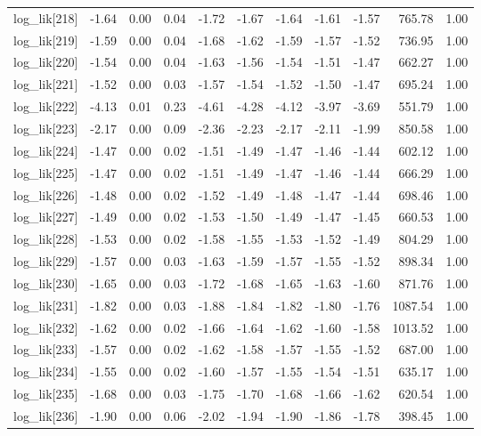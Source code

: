\begin{table}[ht]
\begin{tabular}{rrrrrrrrrrr}
  log\_lik[218] & -1.64 & 0.00 & 0.04 & -1.72 & -1.67 & -1.64 & -1.61 & -1.57 & 765.78 & 1.00 \\ 
  log\_lik[219] & -1.59 & 0.00 & 0.04 & -1.68 & -1.62 & -1.59 & -1.57 & -1.52 & 736.95 & 1.00 \\ 
  log\_lik[220] & -1.54 & 0.00 & 0.04 & -1.63 & -1.56 & -1.54 & -1.51 & -1.47 & 662.27 & 1.00 \\ 
  log\_lik[221] & -1.52 & 0.00 & 0.03 & -1.57 & -1.54 & -1.52 & -1.50 & -1.47 & 695.24 & 1.00 \\ 
  log\_lik[222] & -4.13 & 0.01 & 0.23 & -4.61 & -4.28 & -4.12 & -3.97 & -3.69 & 551.79 & 1.00 \\ 
  log\_lik[223] & -2.17 & 0.00 & 0.09 & -2.36 & -2.23 & -2.17 & -2.11 & -1.99 & 850.58 & 1.00 \\ 
  log\_lik[224] & -1.47 & 0.00 & 0.02 & -1.51 & -1.49 & -1.47 & -1.46 & -1.44 & 602.12 & 1.00 \\ 
  log\_lik[225] & -1.47 & 0.00 & 0.02 & -1.51 & -1.49 & -1.47 & -1.46 & -1.44 & 666.29 & 1.00 \\ 
  log\_lik[226] & -1.48 & 0.00 & 0.02 & -1.52 & -1.49 & -1.48 & -1.47 & -1.44 & 698.46 & 1.00 \\ 
  log\_lik[227] & -1.49 & 0.00 & 0.02 & -1.53 & -1.50 & -1.49 & -1.47 & -1.45 & 660.53 & 1.00 \\ 
  log\_lik[228] & -1.53 & 0.00 & 0.02 & -1.58 & -1.55 & -1.53 & -1.52 & -1.49 & 804.29 & 1.00 \\ 
  log\_lik[229] & -1.57 & 0.00 & 0.03 & -1.63 & -1.59 & -1.57 & -1.55 & -1.52 & 898.34 & 1.00 \\ 
  log\_lik[230] & -1.65 & 0.00 & 0.03 & -1.72 & -1.68 & -1.65 & -1.63 & -1.60 & 871.76 & 1.00 \\ 
  log\_lik[231] & -1.82 & 0.00 & 0.03 & -1.88 & -1.84 & -1.82 & -1.80 & -1.76 & 1087.54 & 1.00 \\ 
  log\_lik[232] & -1.62 & 0.00 & 0.02 & -1.66 & -1.64 & -1.62 & -1.60 & -1.58 & 1013.52 & 1.00 \\ 
  log\_lik[233] & -1.57 & 0.00 & 0.02 & -1.62 & -1.58 & -1.57 & -1.55 & -1.52 & 687.00 & 1.00 \\ 
  log\_lik[234] & -1.55 & 0.00 & 0.02 & -1.60 & -1.57 & -1.55 & -1.54 & -1.51 & 635.17 & 1.00 \\ 
  log\_lik[235] & -1.68 & 0.00 & 0.03 & -1.75 & -1.70 & -1.68 & -1.66 & -1.62 & 620.54 & 1.00 \\ 
  log\_lik[236] & -1.90 & 0.00 & 0.06 & -2.02 & -1.94 & -1.90 & -1.86 & -1.78 & 398.45 & 1.00 \\ 

\end{tabular}
\end{table}
